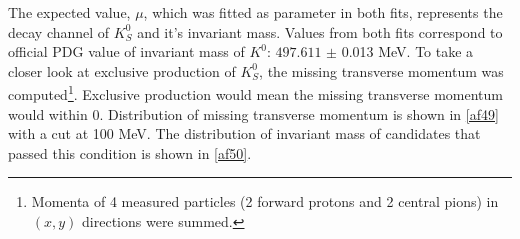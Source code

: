 \FloatBarrier
The expected value, $\mu$, which was fitted as parameter in both fits, represents the decay channel of $K^0_S$ and it's invariant mass. Values from both fits correspond to official PDG value of invariant mass of $K^0$: $497.611$  $\pm$ 0.013 MeV. 
\newline
To take a closer look at exclusive production of $K^0_S$, the missing transverse momentum was computed\footnote{Momenta of 4 measured particles (2 forward protons and 2 central pions) in $(x,y)$ directions were summed.}. Exclusive production would mean the missing transverse momentum would within 0. Distribution of missing transverse momentum is shown in \autoref{af49} with a cut at 100 MeV. The distribution of invariant mass of candidates that passed this condition is shown in \autoref{af50}.

